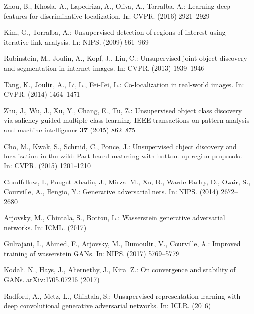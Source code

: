\documentclass[runningheads]{llncs}
\begin{document}
\begin{thebibliography}{10}
Zhou, B., Khosla, A., Lapedriza, A., Oliva, A., Torralba, A.:
\newblock Learning deep features for discriminative localization.
\newblock In: CVPR. (2016)  2921--2929

Kim, G., Torralba, A.:
\newblock Unsupervised detection of regions of interest using iterative link
  analysis.
\newblock In: NIPS. (2009)  961--969

Rubinstein, M., Joulin, A., Kopf, J., Liu, C.:
\newblock Unsupervised joint object discovery and segmentation in internet
  images.
\newblock In: CVPR. (2013)  1939--1946

Tang, K., Joulin, A., Li, L., Fei-Fei, L.:
\newblock Co-localization in real-world images.
\newblock In: CVPR. (2014)  1464--1471

Zhu, J., Wu, J., Xu, Y., Chang, E., Tu, Z.:
\newblock Unsupervised object class discovery via saliency-guided multiple
  class learning.
\newblock IEEE transactions on pattern analysis and machine intelligence
  \textbf{37} (2015)  862--875

Cho, M., Kwak, S., Schmid, C., Ponce, J.:
\newblock Unsupervised object discovery and localization in the wild:
  Part-based matching with bottom-up region proposals.
\newblock In: CVPR. (2015)  1201--1210

Goodfellow, I., Pouget-Abadie, J., Mirza, M., Xu, B., Warde-Farley, D., Ozair,
  S., Courville, A., Bengio, Y.:
\newblock Generative adversarial nets.
\newblock In: NIPS. (2014)  2672--2680

Arjovsky, M., Chintala, S., Bottou, L.:
\newblock Wasserstein generative adversarial networks.
\newblock In: ICML. (2017)

Gulrajani, I., Ahmed, F., Arjovsky, M., Dumoulin, V., Courville, A.:
\newblock Improved training of wasserstein {G}{A}{N}s.
\newblock In: NIPS. (2017)  5769--5779

Kodali, N., Hays, J., Abernethy, J., Kira, Z.:
\newblock On convergence and stability of {G}{A}{N}s.
\newblock arXiv:1705.07215 (2017)

Radford, A., Metz, L., Chintala, S.:
\newblock Unsupervised representation learning with deep convolutional
  generative adversarial networks.
\newblock In: ICLR. (2016)


\end{thebibliography}
\end{document}
